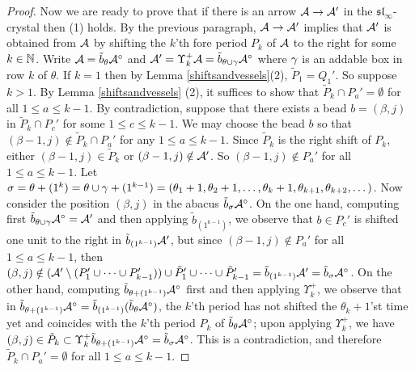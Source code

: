 \documentclass[12pt]{amsart}
\numberwithin{equation}{section}
\theoremstyle{definition}
\newcommand{\emp}{\emptyset}
\newcommand{\slinf}{\mathfrak{sl}_\infty}
\begin{document}
\begin{proof}
Now we are ready to prove that if there is an arrow $\mathcal{A}\to\mathcal{A}'$ in the $\slinf$-crystal then (1) holds. By the previous paragraph, $\mathcal{A}\to\mathcal{A}'$ implies that $\mathcal{A}'$ is obtained from $\mathcal{A}$ by shifting the $k$'th fore period $P_k$ of $\mathcal{A}$ to the right for some $k\in\mathbb{N}$. Write $\mathcal{A}=\tilde{b}_\theta\mathcal{A}^\circ$ and $\mathcal{A}'=\Upsilon_k^+\mathcal{A}=\tilde{b}_{\theta\cup\gamma}\mathcal{A}^\circ$ where $\gamma$ is an addable box in row $k$ of $\theta$. 
If $k=1$ then by Lemma \ref{shiftsandvessels}(2), $\tilde{P}_1=Q_1'$. 
So suppose $k>1$. 
By Lemma \ref{shiftsandvessels} (2),
it suffices to show that $\tilde{P}_{k}\cap P_a'=\emp$ for all $1\leq a\leq k-1$.
By contradiction, suppose that there exists a bead $b=(\beta,j)$ in $\tilde{P}_{k}\cap P_c'$ for some $1\leq c\leq k-1$. We may choose the bead $b$ so that $(\beta-1,j)\notin\tilde{P}_k\cap P_a'$ for any $1\leq a\leq k-1$. Since $\tilde{P}_k$ is the right shift of $P_k$, either $(\beta-1,j)\in\tilde{P}_k$ or $(\beta-1,j)\notin\mathcal{A}'$. So $(\beta-1,j)\notin P_a'$ for all $1\leq a\leq k-1$.
Let $\sigma=\theta+(1^k)=\theta\cup \gamma+(1^{k-1})=(\theta_1+1,\theta_2+1,\dots,\theta_k+1,\theta_{k+1},\theta_{k+2},\dots)$. Now consider the position $(\beta,j)$ in the abacus $\tilde{b}_\sigma\mathcal{A}^\circ$.
On the one hand, computing first $\tilde{b}_{\theta\cup \gamma}\mathcal{A}^\circ=\mathcal{A}'$ and then applying $\tilde{b}_{(1^{k-1})}$, we observe that $b\in P_c'$ 
is shifted one unit to the right in $\tilde{b}_{(1^{k-1})}\mathcal{A}'$, but since $(\beta-1,j)\notin P_a'$ for all $1\leq a\leq k-1$, then $(\beta,j)\notin (\mathcal{A}'\setminus(P_1'\cup\dots\cup P_{k-1}'))\cup \tilde{P}_1'\cup\dots\cup\tilde{P}_{k-1}'=\tilde{b}_{(1^{k-1})}\mathcal{A}'=
\tilde{b}_\sigma\mathcal{A}^\circ$.
On the other hand, computing $\tilde{b}_{\theta+(1^{k-1})}\mathcal{A}^\circ$ first and then applying $\Upsilon_{k}^+$, 
we observe that in $\tilde{b}_{\theta+(1^{k-1})}\mathcal{A}^\circ=\tilde{b}_{(1^{k-1})}(\tilde{b}_\theta \mathcal{A}^\circ)$, the $k$'th period has not shifted the $\theta_{k}+1$'st time yet and coincides with the $k$'th period $P_k$ of $\tilde{b}_\theta \mathcal{A}^\circ$; upon applying $\Upsilon_k^+$, we have $(\beta,j)\in\tilde{P}_{k}\subset \Upsilon^+_k \tilde{b}_{\theta+(1^{k-1})}\mathcal{A}^\circ =\tilde{b}_\sigma\mathcal{A}^\circ$.
This is a contradiction, and therefore $\tilde{P}_{k}\cap P_a'=\emp$ for all $1\leq a \leq k-1$.


\end{proof}
\end{document}
